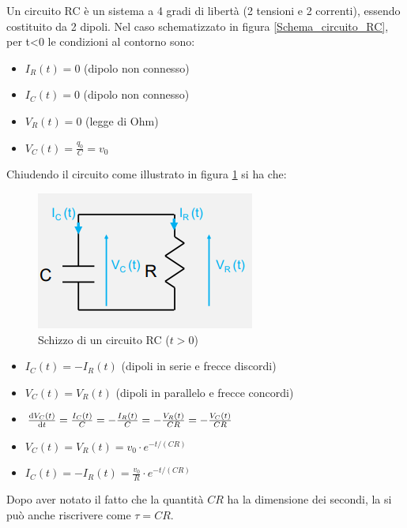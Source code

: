 \documentclass{article}
\begin{document}
Un circuito RC è un sistema a 4 gradi di libertà (2 tensioni e 2 correnti), essendo costituito da 2 dipoli. Nel caso schematizzato in figura \ref{Schema_circuito_RC}, per t<0 le condizioni al contorno sono:

\begin{itemize}
  \item $I_R (t) = 0$ (dipolo non connesso)
  \item $I_C (t) = 0$ (dipolo non connesso)
  \item $V_R (t) = 0$ (legge di Ohm)
  \item $V_C (t) = \frac{q_0}{C} = v_0$
\end{itemize}
\newpage
Chiudendo il circuito come illustrato in figura \ref{Schema_circuito_RC_chiuso} si ha che:

\begin{figure}[h]
  \centering
  \includegraphics[scale=0.7]{IM_circuito_RC_chiuso}
  \caption{Schizzo di un circuito RC ($t>0$)}
  \label{Schema_circuito_RC_chiuso}
\end{figure}

\begin{itemize}
  \item $I_C (t) = - I_R (t)$ (dipoli in serie e frecce discordi)
  \item $V_C (t) = V_R (t)$ (dipoli in parallelo e frecce concordi)
  \item $\frac{\textrm d V_C (t)}{\textrm d t} = \frac{I_C (t)}{C} = - \frac{I_R (t)}{C} = -\frac{V_R (t)}{CR} = -\frac{V_C (t)}{CR}$
  \item $V_C (t) = V_R (t) = v_0 \cdot e^{-t/(CR)}$
  \item $I_C (t) = -I_R (t) = \frac{v_0}{R} \cdot e^{-t/(CR)}$
\end{itemize}

Dopo aver notato il fatto che la quantità $CR$ ha la dimensione dei secondi, la si può anche riscrivere come $\tau = CR$.
\end{document}
